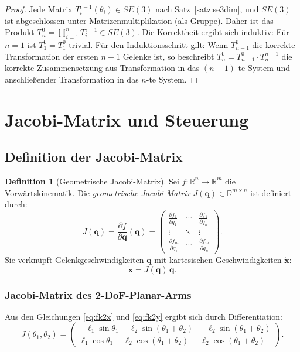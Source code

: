﻿\documentclass[a4paper,12pt]{article}
\theoremstyle{definition}
\newtheorem{definition}{Definition}
\begin{document}
\begin{proof}
	Jede Matrix $T_i^{i-1}(\theta_i) \in SE(3)$ nach Satz~\ref{satz:se3dim}, und $SE(3)$ ist abgeschlossen unter Matrizenmultiplikation (als Gruppe). Daher ist das Produkt $T_n^0 = \prod_{i=1}^n T_i^{i-1} \in SE(3)$. Die Korrektheit ergibt sich induktiv: Für $n=1$ ist $T_1^0 = T_1^0$ trivial. Für den Induktionsschritt gilt: Wenn $T_{n-1}^0$ die korrekte Transformation der ersten $n-1$ Gelenke ist, so beschreibt $T_n^0 = T_{n-1}^0 \cdot T_n^{n-1}$ die korrekte Zusammensetzung aus Transformation in das $(n-1)$-te System und anschließender Transformation in das $n$-te System. \qedhere
\end{proof}

\section{Jacobi-Matrix und Steuerung}

\subsection{Definition der Jacobi-Matrix}

\begin{definition}[Geometrische Jacobi-Matrix]
	Sei $f: \mathbb{R}^n \to \mathbb{R}^m$ die Vorwärtskinematik. Die \emph{geometrische Jacobi-Matrix} $J(\mathbf{q}) \in \mathbb{R}^{m \times n}$ ist definiert durch:
	\[
		J(\mathbf{q}) = \frac{\partial f}{\partial \mathbf{q}}(\mathbf{q}) = \begin{pmatrix} \frac{\partial f_1}{\partial q_1} & \cdots & \frac{\partial f_1}{\partial q_n} \\ \vdots & \ddots & \vdots \\ \frac{\partial f_m}{\partial q_1} & \cdots & \frac{\partial f_m}{\partial q_n} \end{pmatrix}.
	\]
	Sie verknüpft Gelenkgeschwindigkeiten $\dot{\mathbf{q}}$ mit kartesischen Geschwindigkeiten $\dot{\mathbf{x}}$:
	\[
		\dot{\mathbf{x}} = J(\mathbf{q})\, \dot{\mathbf{q}}.
	\]
\end{definition}

\subsubsection{Jacobi-Matrix des 2-DoF-Planar-Arms}

Aus den Gleichungen \eqref{eq:fk2x} und \eqref{eq:fk2y} ergibt sich durch Differentiation:
\[
	J(\theta_1, \theta_2) = \begin{pmatrix}
		-\ell_1 \sin\theta_1 - \ell_2 \sin(\theta_1+\theta_2) & -\ell_2 \sin(\theta_1+\theta_2) \\
		 \ell_1 \cos\theta_1 + \ell_2 \cos(\theta_1+\theta_2) &  \ell_2 \cos(\theta_1+\theta_2)
	\end{pmatrix}.
\]
\end{document}
